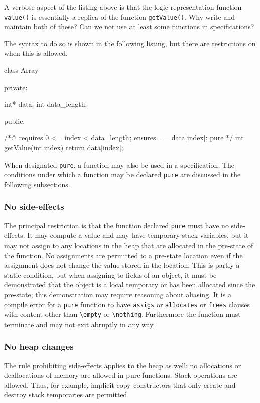 \experimental

A verbose aspect of the listing above is that the logic representation function \lstinline|value()| is essentially a replica of
the \lang function \lstinline|getValue()|. Why write and maintain both of these? Can we not use at least some \lang functions in 
specifications?

The syntax to do so is shown in the following listing, but there are restrictions on when this is allowed.

\begin{listing-nonumber}
class Array {
	
  private:
	
    int* data;
    int data_length;
	
  public:
	
    /*@ 
      requires 0 <= index < data_length;
      ensures \result == data[index];
      pure
    */
    int getValue(int index) {
		return data[index];
    }	
}
\end{listing-nonumber}

When designated \lstinline|pure|, a \lang function may also be used in a \NAME specification. The conditions under which a 
\lang function may be declared \lstinline|pure| are discussed in the following subsections.

\subsubsection{No side-effects}
The principal restriction is that the function declared \lstinline|pure| must have no side-effects. It may compute a value and may have 
temporary stack variables, but it may not assign to any locations in the heap that are allocated in the pre-state of the function.
No assignments are permitted to a pre-state location even if the assignment does not change the value stored in the location.
This is partly a static condition, but when assigning to fields of an object, it must be demonstrated that the object is a local temporary or
has been allocated since the pre-state; this demonstration may require reasoning about aliasing. It is a compile error for a \lstinline|pure|
function to have \lstinline|assigs| or \lstinline|allocates| or \lstinline|frees| clauses with content other than \lstinline|\empty| or \lstinline|\nothing|.
Furthermore the function must terminate and may not exit abruptly in any way.

\subsubsection{No heap changes}
The rule prohibiting side-effects applies to the heap as well:
no allocations or deallocations of memory are allowed in pure functions.
Stack operations are allowed. Thus, for example,
 implicit copy constructors that 
only create and destroy stack temporaries are permitted.

